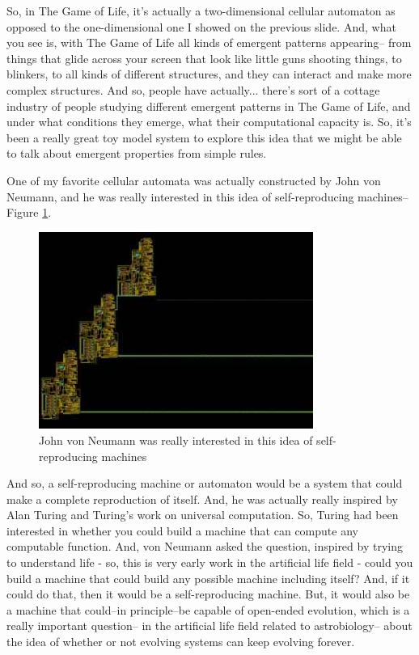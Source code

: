 \documentclass[]{article}
\begin{document}
So, in The Game of Life,
it's actually a two-dimensional
cellular automaton
as opposed to the one-dimensional one
I showed on the previous slide.
And, what you see is,
with The Game of Life
all kinds of emergent patterns
appearing--
from things that glide
across your screen
that look like little guns
shooting things,
to blinkers,
to all kinds of different structures,
and they can interact
and make more complex structures.
And so, people have actually...
there's sort of a cottage industry
of people studying different emergent
patterns in The Game of Life,
and under what conditions they emerge,
what their computational capacity is.
So, it's been a really great
toy model system to explore this idea
that we might be able to talk about
emergent properties from simple rules.

One of my favorite cellular automata
was actually constructed
by John von Neumann,
and he was really interested in this idea
of self-reproducing machines--Figure \ref{fig:VonNeumannSelfRep}.

\begin{figure}[H]
	\caption[John von Neumann: self-reproducing machines]{John von Neumann was really interested in this idea of self-reproducing machines\cite{neumann1966theory,neumann1958computer}}\label{fig:VonNeumannSelfRep}
	\includegraphics[width=0.8\textwidth]{VonNeumannSelfRep}
\end{figure}



And so, a self-reproducing machine
or automaton
would be a system that could make
a complete reproduction of itself.
And, he was actually really inspired
by Alan Turing
and Turing's work
on universal computation.
So, Turing had been interested in
whether you could build a machine
that can compute
any computable function.
And, von Neumann asked the question,
inspired by trying to understand life -
so, this is very early work
in the artificial life field -
could you build a machine
that could build any possible machine
including itself?
And, if it could do that,
then it would be
a self-reproducing machine.
But, it would also be a machine
that could--in principle--be capable of open-ended evolution,
which is a really important question--
in the artificial life field
related to astrobiology--
about the idea of whether or not evolving
systems can keep evolving forever.
\end{document}
